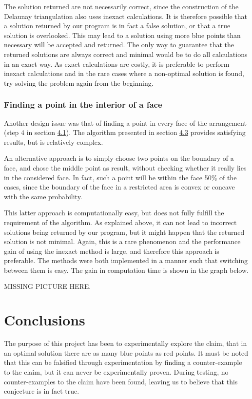 \documentclass[a4paper,12pt]{article}
\begin{document}
The solution returned are not necessarily correct, since the construction of the Delaunay triangulation also uses inexact calculations. It is therefore possible that a solution returned by our program is in fact a false solution, or that a true solution is overlooked. This may lead to a solution using more blue points than necessary will be accepted and returned. The only way to guarantee that the returned solutions are always correct and minimal would be to do all calculations in an exact way. As exact calculations are costly, it is preferable to perform inexact calculations and in the rare cases where a non-optimal solution is found, try solving the problem again from the beginning.

\subsubsection{Finding a point in the interior of a face}

Another design issue was that of finding a point in every face of the arrangement (step 4 in section \hyperref[ref:Algorithm]{4.1}). The algorithm presented in section \hyperref[sec:findPoints]{4.3} provides satisfying results, but is relatively complex.

An alternative approach is to simply choose two points on the boundary of a face, and chose the middle point as result, without checking whether it really lies in the considered face. In fact, such a point will be within the face 50\% of the cases, since the boundary of the face in a restricted area is convex or concave with the same probability. 

This latter approach is computationally easy, but does not fully fulfill the requirement of the algorithm. As explained above, it can not lead to incorrect solutions being returned by our program, but it might happen that the returned solution is not minimal. Again, this is a rare phenomenon and the performance gain of using the inexact method is large, and therefore this approach is preferable. The methods were both implemented in a manner such that switching between them is easy. The gain in computation time is shown in the graph below.

MISSING PICTURE HERE.

\section{Conclusions}
The purpose of this project has been to experimentally explore the claim, that in an optimal solution there are as many blue points as red points. It must be noted that this can be falsified through experimentation by finding a counter-example to the claim, but it can never be experimentally proven. During testing, no counter-examples to the claim have been found, leaving us to believe that this conjecture is in fact true.
\end{document}
